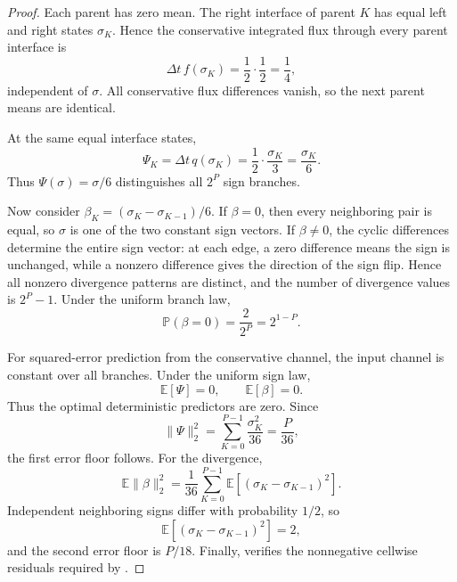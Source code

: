 \documentclass[a4paper,fleqn, sort&compress]{cas-sc}
\theoremstyle{remark}
\theoremstyle{definition}
\begin{document}
\begin{proof}
Each parent has zero mean.  The right interface of parent \(K\) has equal
left and right states \(\sigma_K\).  Hence the conservative integrated flux
through every parent interface is
\[
  \Delta t\, f(\sigma_K)=\frac12\cdot\frac12=\frac14,
\]
independent of \(\sigma\).  All conservative flux differences vanish, so the
next parent means are identical.

At the same equal interface states,
\[
  \Psi_K=\Delta t\,q(\sigma_K)=\frac12\cdot\frac{\sigma_K}{3}
  =
  \frac{\sigma_K}{6}.
\]
Thus \(\Psi(\sigma)=\sigma/6\) distinguishes all \(2^P\) sign branches.

Now consider \(\beta_K=(\sigma_K-\sigma_{K-1})/6\).  If
\(\beta=0\), then every neighboring pair is equal, so \(\sigma\) is one of
the two constant sign vectors.  If \(\beta\ne0\), the cyclic differences
determine the entire sign vector: at each edge, a zero difference means the
sign is unchanged, while a nonzero difference gives the direction of the
sign flip.  Hence all nonzero divergence patterns are distinct, and the
number of divergence values is \(2^P-1\).  Under the uniform branch law,
\[
  \mathbb P(\beta=0)=\frac{2}{2^P}=2^{1-P}.
\]

For squared-error prediction from the conservative channel, the input channel
is constant over all branches.  Under the uniform sign law,
\[
  \mathbb E[\Psi]=0,
  \qquad
  \mathbb E[\beta]=0.
\]
Thus the optimal deterministic predictors are zero.  Since
\[
  \|\Psi\|_2^2=\sum_{K=0}^{P-1}\frac{\sigma_K^2}{36}=\frac{P}{36},
\]
the first error floor follows.  For the divergence,
\[
  \mathbb E\|\beta\|_2^2
  =
  \frac1{36}
  \sum_{K=0}^{P-1}\mathbb E[(\sigma_K-\sigma_{K-1})^2].
\]
Independent neighboring signs differ with probability \(1/2\), so
\[
  \mathbb E[(\sigma_K-\sigma_{K-1})^2]=2,
\]
and the second error floor is \(P/18\).  Finally,
 verifies the nonnegative cellwise
residuals required by .
\end{proof}
\end{document}
